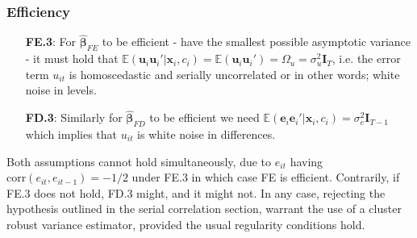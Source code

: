 \subsubsection*{Efficiency}

\begin{itemize}
    \item [\textbf{FE.3}:] For $\hat{\bm{\beta}}_{FE}$ to be efficient - have the smallest possible asymptotic variance - it must hold that $\mathbb{E}(\bm{u}_i \bm{u}_i' | \bm{x}_i, c_i) = \mathbb{E}(\bm{u}_i \bm{u}_i') = \Omega_{u} = \sigma^2_u \bm{I}_T$, i.e. the error term $u_{it}$ is homoscedastic and serially uncorrelated or in other words; white noise in levels. 
    \item [\textbf{FD.3}:] Similarly for $\hat{\bm{\beta}}_{FD}$ to be efficient we need $\mathbb{E}(\bm{e}_i \bm{e}_{i}'|\bm{x}_i, c_i) = \sigma^{2}_{e} \bm{I}_{T-1}$ which implies that $u_{it}$ is white noise in differences. 
\end{itemize}
Both assumptions cannot hold simultaneously, due to $e_{it}$ having $\text{corr}(e_{it}, e_{it-1})= -1/2$ under FE.3 in which case FE is efficient. Contrarily, if FE.3 does not hold, FD.3 might, and it might not. In any case, rejecting the hypothesis outlined in the serial correlation section, warrant the use of a cluster robust variance estimator, provided the usual regularity conditions hold. 


